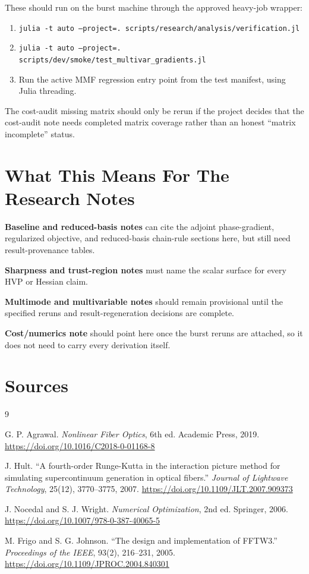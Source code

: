 \documentclass[11pt]{article}
\begin{document}
These should run on the burst machine through the approved heavy-job wrapper:

\begin{enumerate}
    \item \texttt{julia -t auto --project=. scripts/research/analysis/verification.jl}
    \item \texttt{julia -t auto --project=. scripts/dev/smoke/test\_multivar\_gradients.jl}
    \item Run the active MMF regression entry point from the test manifest,
    using Julia threading.
\end{enumerate}

The cost-audit missing matrix should only be rerun if the project decides that
the cost-audit note needs completed matrix coverage rather than an honest
``matrix incomplete'' status.

\section{What This Means For The Research Notes}

\textbf{Baseline and reduced-basis notes} can cite the adjoint phase-gradient,
regularized objective, and reduced-basis chain-rule sections here, but still
need result-provenance tables.

\textbf{Sharpness and trust-region notes} must name the scalar surface for every
HVP or Hessian claim.

\textbf{Multimode and multivariable notes} should remain provisional until the
specified reruns and result-regeneration decisions are complete.

\textbf{Cost/numerics note} should point here once the burst reruns are attached,
so it does not need to carry every derivation itself.

\section{Sources}

\begin{thebibliography}{9}

G. P. Agrawal.
\textit{Nonlinear Fiber Optics}, 6th ed.
Academic Press, 2019.
\url{https://doi.org/10.1016/C2018-0-01168-8}

J. Hult.
``A fourth-order Runge-Kutta in the interaction picture method for simulating
supercontinuum generation in optical fibers.''
\textit{Journal of Lightwave Technology}, 25(12), 3770--3775, 2007.
\url{https://doi.org/10.1109/JLT.2007.909373}

J. Nocedal and S. J. Wright.
\textit{Numerical Optimization}, 2nd ed.
Springer, 2006.
\url{https://doi.org/10.1007/978-0-387-40065-5}

M. Frigo and S. G. Johnson.
``The design and implementation of FFTW3.''
\textit{Proceedings of the IEEE}, 93(2), 216--231, 2005.
\url{https://doi.org/10.1109/JPROC.2004.840301}

\end{thebibliography}
\end{document}
